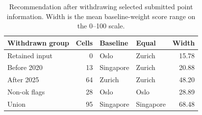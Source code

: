 \begin{table}[!ht]\centering
\caption{Recommendation after withdrawing selected submitted point information. Width is the mean baseline-weight score range on the 0--100 scale.}\label{tab:vintage}
\begin{tabular}{l r l l r}\toprule
Withdrawn group & Cells & Baseline & Equal & Width\\\midrule
Retained input & 0 & Oslo & Zurich & 15.78 \\
Before 2020 & 13 & Singapore & Zurich & 20.88 \\
After 2025 & 64 & Zurich & Zurich & 48.20 \\
Non-ok flags & 28 & Oslo & Oslo & 28.89 \\
Union & 95 & Singapore & Singapore & 68.48 \\
\bottomrule\end{tabular}\end{table}
